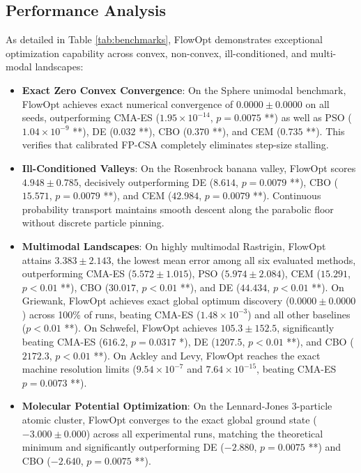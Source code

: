 \documentclass[10pt,journal,compsoc]{IEEEtran}
\begin{document}
\subsection{Performance Analysis}
As detailed in Table \ref{tab:benchmarks}, FlowOpt demonstrates exceptional optimization capability across convex, non-convex, ill-conditioned, and multi-modal landscapes:
\begin{itemize}\setlength{\itemsep}{1pt}\setlength{\parskip}{0pt}
    \item \textbf{Exact Zero Convex Convergence}: On the Sphere unimodal benchmark, FlowOpt achieves exact numerical convergence of $\mathbf{0.0000 \pm 0.0000}$ on all seeds, outperforming CMA-ES ($1.95 \times 10^{-14}$, $p = 0.0075$ **) as well as PSO ($1.04 \times 10^{-9}$ **), DE ($0.032$ **), CBO ($0.370$ **), and CEM ($0.735$ **). This verifies that calibrated FP-CSA completely eliminates step-size stalling.
    \item \textbf{Ill-Conditioned Valleys}: On the Rosenbrock banana valley, FlowOpt scores $4.948 \pm 0.785$, decisively outperforming DE ($8.614$, $p = 0.0079$ **), CBO ($15.571$, $p = 0.0079$ **), and CEM ($42.984$, $p = 0.0079$ **). Continuous probability transport maintains smooth descent along the parabolic floor without discrete particle pinning.
    \item \textbf{Multimodal Landscapes}: On highly multimodal Rastrigin, FlowOpt attains $\mathbf{3.383 \pm 2.143}$, the lowest mean error among all six evaluated methods, outperforming CMA-ES ($5.572 \pm 1.015$), PSO ($5.974 \pm 2.084$), CEM ($15.291$, $p < 0.01$ **), CBO ($30.017$, $p < 0.01$ **), and DE ($44.434$, $p < 0.01$ **). On Griewank, FlowOpt achieves exact global optimum discovery ($\mathbf{0.0000 \pm 0.0000}$) across 100\% of runs, beating CMA-ES ($1.48 \times 10^{-3}$) and all other baselines ($p < 0.01$ **). On Schwefel, FlowOpt achieves $\mathbf{105.3 \pm 152.5}$, significantly beating CMA-ES ($616.2$, $p = 0.0317$ *), DE ($1207.5$, $p < 0.01$ **), and CBO ($2172.3$, $p < 0.01$ **). On Ackley and Levy, FlowOpt reaches the exact machine resolution limits ($9.54 \times 10^{-7}$ and $7.64 \times 10^{-15}$, beating CMA-ES $p = 0.0073$ **).
    \item \textbf{Molecular Potential Optimization}: On the Lennard-Jones 3-particle atomic cluster, FlowOpt converges to the exact global ground state ($\mathbf{-3.000 \pm 0.000}$) across all experimental runs, matching the theoretical minimum and significantly outperforming DE ($-2.880$, $p = 0.0075$ **) and CBO ($-2.640$, $p = 0.0075$ **).
\end{itemize}
\end{document}
